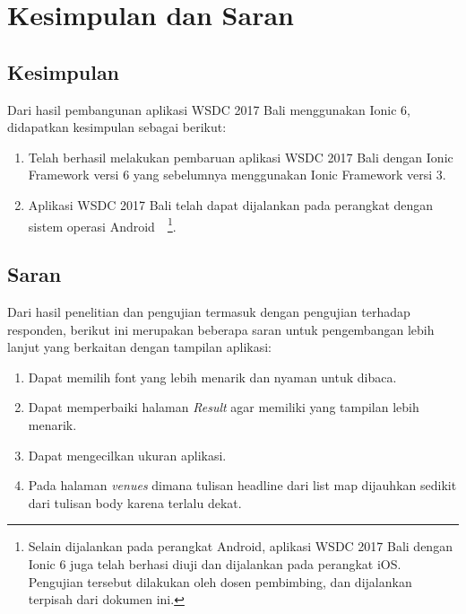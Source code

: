 \chapter{Kesimpulan dan Saran}
\label{chap:kesimpulanSaran}

\section{Kesimpulan} 
\label{sec:kesimpulan}

Dari hasil pembangunan aplikasi WSDC 2017 Bali menggunakan Ionic 6, didapatkan kesimpulan sebagai berikut:

\begin{enumerate}
	\item Telah berhasil melakukan pembaruan aplikasi WSDC 2017 Bali dengan Ionic Framework versi 6 yang sebelumnya menggunakan Ionic Framework versi 3.
	\item Aplikasi WSDC 2017 Bali telah dapat dijalankan pada perangkat dengan sistem operasi Android~~\footnote{Selain dijalankan pada perangkat Android, aplikasi WSDC 2017 Bali dengan Ionic 6 juga telah berhasi diuji dan dijalankan pada perangkat iOS. Pengujian tersebut dilakukan oleh dosen pembimbing, dan dijalankan terpisah dari dokumen ini.}.
\end{enumerate}

\section{Saran} 
\label{sec:saran}

Dari hasil penelitian dan pengujian termasuk dengan pengujian terhadap responden, berikut ini merupakan beberapa saran untuk pengembangan lebih lanjut yang berkaitan dengan tampilan aplikasi:

\begin{enumerate}
	\item Dapat memilih font yang lebih menarik dan nyaman untuk dibaca.
	\item Dapat memperbaiki halaman \textit{Result} agar memiliki yang tampilan lebih menarik.
	\item Dapat mengecilkan ukuran aplikasi.
	\item Pada halaman \textit{venues} dimana tulisan headline dari list map dijauhkan sedikit dari tulisan body karena terlalu dekat.
\end{enumerate}